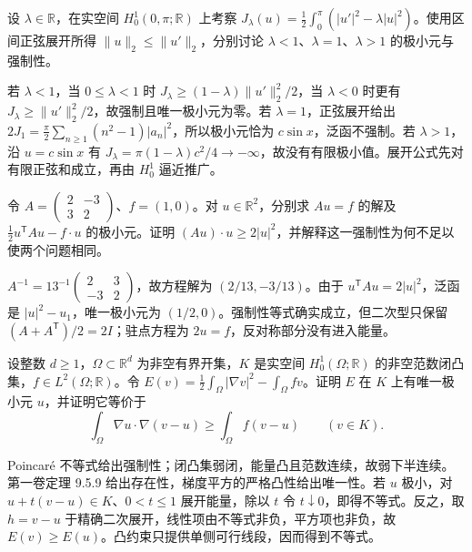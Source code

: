 \begin{exercise}\label{b2:ex:14-negative-potential}
设 \(\lambda\in\mathbb R\)，在实空间 \(H_0^1(0,\pi;\mathbb R)\) 上考察 \(J_\lambda(u)=\tfrac12\int_0^\pi(|u'|^2-\lambda|u|^2)\)。使用区间正弦展开所得 \(\lVert u\rVert_2\le\lVert u'\rVert_2\)，分别讨论 \(\lambda<1\)、\(\lambda=1\)、\(\lambda>1\) 的极小元与强制性。
\end{exercise}
\begin{solution}
若 \(\lambda<1\)，当 \(0\le\lambda<1\) 时 \(J_\lambda\ge(1-\lambda)\lVert u'\rVert_2^2/2\)，当 \(\lambda<0\) 时更有 \(J_\lambda\ge\lVert u'\rVert_2^2/2\)，故强制且唯一极小元为零。若 \(\lambda=1\)，正弦展开给出 \(2J_1=\frac\pi2\sum_{n\ge1}(n^2-1)|a_n|^2\)，所以极小元恰为 \(c\sin x\)，泛函不强制。若 \(\lambda>1\)，沿 \(u=c\sin x\) 有 \(J_\lambda=\pi(1-\lambda)c^2/4\to-\infty\)，故没有有限极小值。展开公式先对有限正弦和成立，再由 \(H_0^1\) 逼近推广。
\end{solution}

\begin{exercise}\label{b2:ex:14-skew-part}
令 \(A=\left(\begin{smallmatrix}2&-3\\3&2\end{smallmatrix}\right)\)、\(f=(1,0)\)。对 \(u\in\mathbb R^2\)，分别求 \(Au=f\) 的解及 \(\tfrac12u^{\mathsf T}Au-f\cdot u\) 的极小元。证明 \((Au)\cdot u\ge2|u|^2\)，并解释这一强制性为何不足以使两个问题相同。
\end{exercise}
\begin{solution}
\(A^{-1}=13^{-1}\left(\begin{smallmatrix}2&3\\-3&2\end{smallmatrix}\right)\)，故方程解为 \((2/13,-3/13)\)。由于 \(u^{\mathsf T}Au=2|u|^2\)，泛函是 \(|u|^2-u_1\)，唯一极小元为 \((1/2,0)\)。强制性等式确实成立，但二次型只保留 \((A+A^{\mathsf T})/2=2I\)；驻点方程为 \(2u=f\)，反对称部分没有进入能量。
\end{solution}

\begin{exercise}\label{b2:ex:14-obstacle}
设整数 \(d\geq1\)，\(\Omega\subset\mathbb R^d\) 为非空有界开集，\(K\) 是实空间 \(H_0^1(\Omega;\mathbb R)\) 的非空范数闭凸集，\(f\in L^2(\Omega;\mathbb R)\)。令 \(E(v)=\frac12\int_\Omega|\nabla v|^2-\int_\Omega fv\)。证明 \(E\) 在 \(K\) 上有唯一极小元 \(u\)，并证明它等价于
\[\int_\Omega\nabla u\cdot\nabla(v-u)\ge\int_\Omega f(v-u)\qquad(v\in K).\]
\end{exercise}
\begin{solution}
Poincaré 不等式给出强制性；闭凸集弱闭，能量凸且范数连续，故弱下半连续。第一卷定理 9.5.9 给出存在性，梯度平方的严格凸性给出唯一性。若 \(u\) 极小，对 \(u+t(v-u)\in K\)、\(0<t\le1\) 展开能量，除以 \(t\) 令 \(t\downarrow0\)，即得不等式。反之，取 \(h=v-u\) 于精确二次展开，线性项由不等式非负，平方项也非负，故 \(E(v)\ge E(u)\)。凸约束只提供单侧可行线段，因而得到不等式。
\end{solution}

